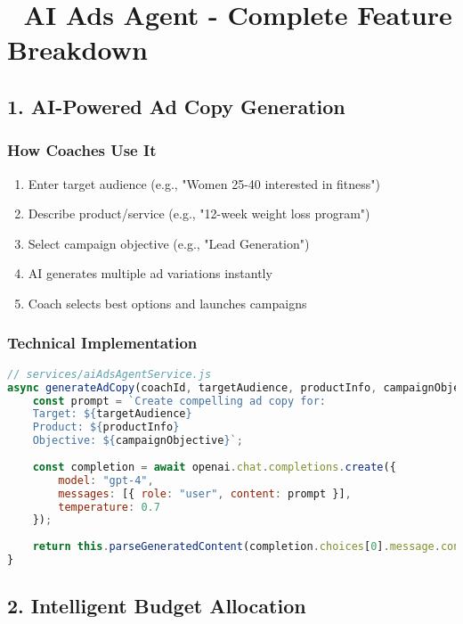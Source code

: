 \documentclass[12pt,a4paper]{article}
\begin{document}
\section{🤖 AI Ads Agent - Complete Feature Breakdown}

\subsection{1. AI-Powered Ad Copy Generation}

\subsubsection{How Coaches Use It}
\begin{enumerate}
    \item Enter target audience (e.g., "Women 25-40 interested in fitness")
    \item Describe product/service (e.g., "12-week weight loss program")
    \item Select campaign objective (e.g., "Lead Generation")
    \item AI generates multiple ad variations instantly
    \item Coach selects best options and launches campaigns
\end{enumerate}

\subsubsection{Technical Implementation}
\begin{lstlisting}[language=JavaScript]
// services/aiAdsAgentService.js
async generateAdCopy(coachId, targetAudience, productInfo, campaignObjective) {
    const prompt = `Create compelling ad copy for:
    Target: ${targetAudience}
    Product: ${productInfo}
    Objective: ${campaignObjective}`;
    
    const completion = await openai.chat.completions.create({
        model: "gpt-4",
        messages: [{ role: "user", content: prompt }],
        temperature: 0.7
    });
    
    return this.parseGeneratedContent(completion.choices[0].message.content);
}
\end{lstlisting}

\subsection{2. Intelligent Budget Allocation}
\end{document}
